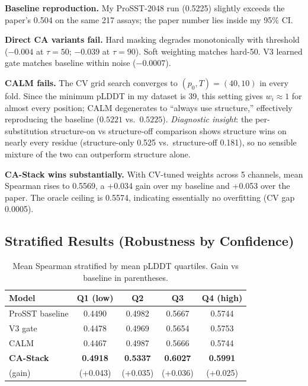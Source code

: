 \documentclass[11pt,a4paper]{article}
\begin{document}
\textbf{Baseline reproduction.} My ProSST-2048 run (0.5225) slightly
exceeds the paper's 0.504 on the same 217 assays; the paper number lies
inside my 95\% CI.

\textbf{Direct CA variants fail.} Hard masking degrades monotonically
with threshold ($-0.004$ at $\tau{=}50$; $-0.039$ at $\tau{=}90$). Soft
weighting matches hard-50. V3 learned gate matches baseline within
noise ($-0.0007$).

\textbf{CALM fails.} The CV grid search converges to $(p_0, T)=(40, 10)$
in every fold. Since the minimum pLDDT in my dataset is 39, this
setting gives $w_i \approx 1$ for almost every position; CALM degenerates
to ``always use structure,'' effectively reproducing the baseline
($0.5221$ vs.\ $0.5225$). \emph{Diagnostic insight}: the per-substitution
structure-on vs structure-off comparison shows structure wins on
nearly every residue (structure-only 0.525 vs.\ structure-off 0.181),
so no sensible mixture of the two can outperform structure alone.

\textbf{CA-Stack wins substantially.} With CV-tuned weights across
5 channels, mean Spearman rises to 0.5569, a +0.034 gain over my
baseline and +0.053 over the paper. The oracle ceiling is 0.5574,
indicating essentially no overfitting (CV gap 0.0005).

\subsection{Stratified Results (Robustness by Confidence)}

\begin{table}[h]
\centering
\caption{Mean Spearman stratified by mean pLDDT quartiles. Gain vs
baseline in parentheses.}
\label{tab:strat}
\begin{tabular}{lcccc}
\toprule
Model & Q1 (low) & Q2 & Q3 & Q4 (high) \\
\midrule
ProSST baseline        & 0.4490 & 0.4982 & 0.5667 & 0.5744 \\
V3 gate                & 0.4478 & 0.4969 & 0.5654 & 0.5753 \\
CALM                   & 0.4467 & 0.4987 & 0.5666 & 0.5744 \\
\midrule
\textbf{CA-Stack}      & \textbf{0.4918} & \textbf{0.5337} & \textbf{0.6027} & \textbf{0.5991} \\
\quad (gain)           & (+0.043) & (+0.035) & (+0.036) & (+0.025) \\
\bottomrule
\end{tabular}
\end{table}
\end{document}
